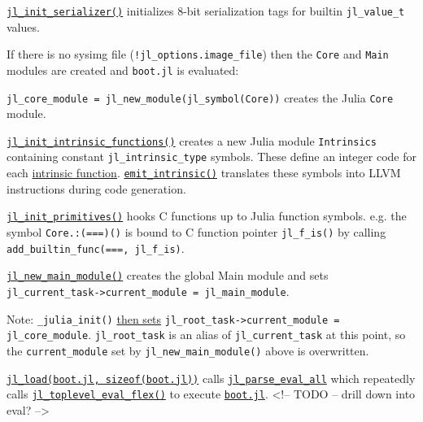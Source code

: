 \href{https://github.com/JuliaLang/julia/blob/master/src/staticdata.c}{\texttt{jl\_init\_serializer()}} initializes 8-bit serialization tags for builtin \texttt{jl\_value\_t} values.



If there is no sysimg file (\texttt{!jl\_options.image\_file}) then the \texttt{Core} and \texttt{Main} modules are created and \texttt{boot.jl} is evaluated:



\texttt{jl\_core\_module = jl\_new\_module(jl\_symbol({\textquotedbl}Core{\textquotedbl}))} creates the Julia \texttt{Core} module.



\href{https://github.com/JuliaLang/julia/blob/master/src/intrinsics.cpp}{\texttt{jl\_init\_intrinsic\_functions()}} creates a new Julia module \texttt{Intrinsics} containing constant \texttt{jl\_intrinsic\_type} symbols. These define an integer code for each \href{https://github.com/JuliaLang/julia/blob/master/src/intrinsics.cpp}{intrinsic function}. \href{https://github.com/JuliaLang/julia/blob/master/src/intrinsics.cpp}{\texttt{emit\_intrinsic()}} translates these symbols into LLVM instructions during code generation.



\href{https://github.com/JuliaLang/julia/blob/master/src/builtins.c}{\texttt{jl\_init\_primitives()}} hooks C functions up to Julia function symbols. e.g. the symbol \texttt{Core.:(===)()} is bound to C function pointer \texttt{jl\_f\_is()} by calling \texttt{add\_builtin\_func({\textquotedbl}==={\textquotedbl}, jl\_f\_is)}.



\href{https://github.com/JuliaLang/julia/blob/master/src/toplevel.c}{\texttt{jl\_new\_main\_module()}} creates the global {\textquotedbl}Main{\textquotedbl} module and sets \texttt{jl\_current\_task->current\_module = jl\_main\_module}.



Note: \texttt{\_julia\_init()} \href{https://github.com/JuliaLang/julia/blob/master/src/init.c}{then sets} \texttt{jl\_root\_task->current\_module = jl\_core\_module}. \texttt{jl\_root\_task} is an alias of \texttt{jl\_current\_task} at this point, so the \texttt{current\_module} set by \texttt{jl\_new\_main\_module()} above is overwritten.



\href{https://github.com/JuliaLang/julia/blob/master/src/init.c}{\texttt{jl\_load({\textquotedbl}boot.jl{\textquotedbl}, sizeof({\textquotedbl}boot.jl{\textquotedbl}))}} calls \href{https://github.com/JuliaLang/julia/blob/master/src/ast.c}{\texttt{jl\_parse\_eval\_all}} which repeatedly calls \href{https://github.com/JuliaLang/julia/blob/master/src/toplevel.c}{\texttt{jl\_toplevel\_eval\_flex()}} to execute \href{https://github.com/JuliaLang/julia/blob/master/base/boot.jl}{\texttt{boot.jl}}. <!– TODO – drill down into eval? –>



